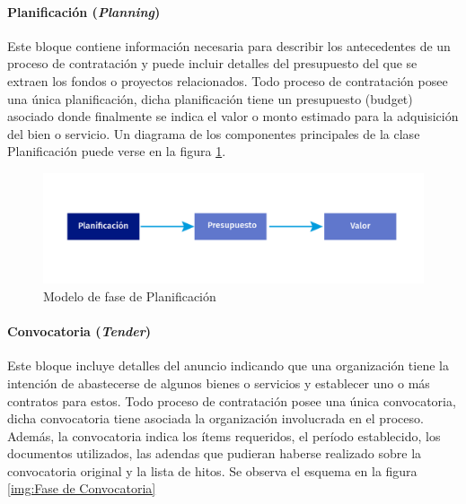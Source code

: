 \paragraph{Planificación (\textit{Planning})}\hfill \break
Este bloque contiene información necesaria para describir los antecedentes de un proceso de contratación y puede incluir detalles del presupuesto del que se extraen los fondos o proyectos relacionados. Todo proceso de contratación posee una única planificación, dicha planificación tiene un presupuesto (budget) asociado donde finalmente se indica el valor o monto estimado para la adquisición del bien o servicio. Un diagrama de los componentes principales de la clase Planificación puede verse en la figura \ref{img:Fase de Planificacion}.

\begin{figure}[htbp!]
    \centering
    \includegraphics[width=150mm]{figuras/Diagramas_Planificacion.png}
    \caption{Modelo de fase de Planificación}
    \label{img:Fase de Planificacion}
\end{figure}

\paragraph{Convocatoria (\textit{Tender})}\hfill \break
Este bloque incluye detalles del anuncio indicando que una organización tiene la intención de abastecerse de algunos bienes o servicios y establecer uno o más contratos para estos. Todo proceso de contratación posee una única convocatoria, dicha convocatoria tiene asociada la organización involucrada en el proceso. Además, la convocatoria indica los ítems requeridos, el período establecido, los documentos utilizados, las adendas que pudieran haberse realizado sobre la convocatoria original y la lista de hitos. Se observa el esquema en la figura \ref{img:Fase de Convocatoria}

